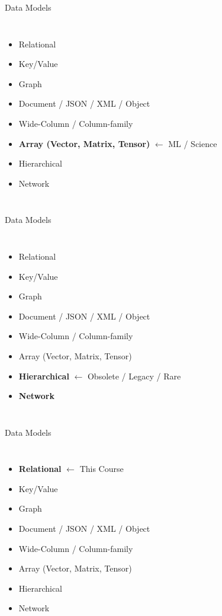 \begin{frame}{Data Models}
    \begin{columns}
        \begin{itemize}
            \item Relational
            \item Key/Value
            \item Graph
            \item Document / JSON / XML / Object
            \item Wide-Column / Column-family
            \item \textbf{Array (Vector, Matrix, Tensor)} $\leftarrow$ ML / Science
            \item Hierarchical
            \item Network
        \end{itemize}
    \end{columns}
\end{frame}

\begin{frame}{Data Models}
    \begin{columns}
        \begin{itemize}
            \item Relational
            \item Key/Value
            \item Graph
            \item Document / JSON / XML / Object
            \item Wide-Column / Column-family
            \item Array (Vector, Matrix, Tensor)
            \item \textbf{Hierarchical} $\leftarrow$ Obsolete / Legacy / Rare
            \item \textbf{Network}
        \end{itemize}
    \end{columns}
\end{frame}

\begin{frame}{Data Models}
    \begin{columns}
        \begin{itemize}
            \item \textbf{Relational} $\leftarrow$ This Course
            \item Key/Value
            \item Graph
            \item Document / JSON / XML / Object
            \item Wide-Column / Column-family
            \item Array (Vector, Matrix, Tensor)
            \item Hierarchical
            \item Network
        \end{itemize}
    \end{columns}
\end{frame}

